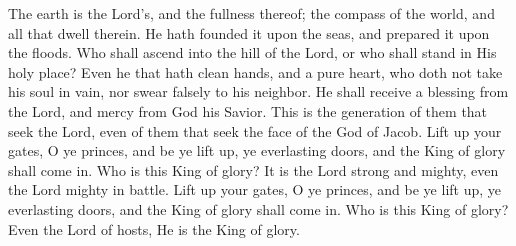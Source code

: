 The earth is the Lord’s, and the fullness thereof; the compass of the world, and all that dwell therein. He hath founded it upon the seas, and prepared it upon the floods. Who shall ascend into the hill of the Lord, or who shall stand in His holy place? Even he that hath clean hands, and a pure heart, who doth not take his soul in vain, nor swear falsely to his neighbor. He shall receive a blessing from the Lord, and mercy from God his Savior. This is the generation of them that seek the Lord, even of them that seek the face of the God of Jacob. Lift up your gates, O ye princes, and be ye lift up, ye everlasting doors, and the King of glory shall come in. Who is this King of glory? It is the Lord strong and mighty, even the Lord mighty in battle. Lift up your gates, O ye princes, and be ye lift up, ye everlasting doors, and the King of glory shall come in. Who is this King of glory? Even the Lord of hosts, He is the King of glory.
